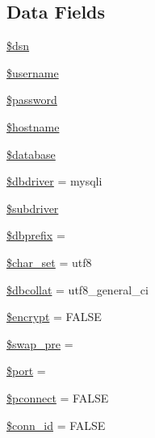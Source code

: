 \subsection*{Data Fields}
\begin{DoxyCompactItemize}
\item 
\mbox{\hyperlink{class_c_i___d_b__driver_a6441cca8c9fa11e16d2017e8cb733c10}{\$dsn}}
\item 
\mbox{\hyperlink{class_c_i___d_b__driver_a0eb82aa5f81cf845de4b36cd653c42cf}{\$username}}
\item 
\mbox{\hyperlink{class_c_i___d_b__driver_a607686ef9f99ea7c42f4f3dd3dbb2b0d}{\$password}}
\item 
\mbox{\hyperlink{class_c_i___d_b__driver_a8bf9ffb42ed554b203b55377d1fc9aa4}{\$hostname}}
\item 
\mbox{\hyperlink{class_c_i___d_b__driver_a7691c0162d89de0b6ba47edcd8ba8878}{\$database}}
\item 
\mbox{\hyperlink{class_c_i___d_b__driver_a0cde2a16322a023d040aa7f725877597}{\$dbdriver}} = \textquotesingle{}mysqli\textquotesingle{}
\item 
\mbox{\hyperlink{class_c_i___d_b__driver_a1322ca756348b11d080cb7a4f590de15}{\$subdriver}}
\item 
\mbox{\hyperlink{class_c_i___d_b__driver_a81398da65aef92236c2bc2e0307f1fa4}{\$dbprefix}} = \textquotesingle{}\textquotesingle{}
\item 
\mbox{\hyperlink{class_c_i___d_b__driver_a0ea660eb249174aefdc2c35238fb1dc8}{\$char\+\_\+set}} = \textquotesingle{}utf8\textquotesingle{}
\item 
\mbox{\hyperlink{class_c_i___d_b__driver_a303eb205131e0266c2a57bcc6a34e80a}{\$dbcollat}} = \textquotesingle{}utf8\+\_\+general\+\_\+ci\textquotesingle{}
\item 
\mbox{\hyperlink{class_c_i___d_b__driver_a1e32803d860e58570971345dddd14d8e}{\$encrypt}} = F\+A\+L\+SE
\item 
\mbox{\hyperlink{class_c_i___d_b__driver_a913c5a5af0c805fe64f884af6028fb73}{\$swap\+\_\+pre}} = \textquotesingle{}\textquotesingle{}
\item 
\mbox{\hyperlink{class_c_i___d_b__driver_aa0787efab4b22e8a212882f3409d4c77}{\$port}} = \textquotesingle{}\textquotesingle{}
\item 
\mbox{\hyperlink{class_c_i___d_b__driver_a5b7c010f6dfe8dfd41ce86fdaed67ebf}{\$pconnect}} = F\+A\+L\+SE
\item 
\mbox{\hyperlink{class_c_i___d_b__driver_a16c23f1dcbfed2f2759f5e54f604106d}{\$conn\+\_\+id}} = F\+A\+L\+SE

\end{DoxyCompactItemize}
